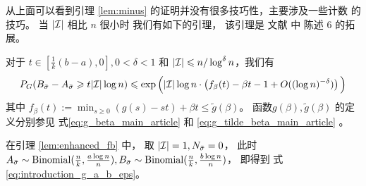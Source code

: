 从上面可以看到引理 \ref{lem:minus} 的证明并没有很多技巧性，主要涉及一些计数
的技巧。
当 $|\mathcal{I}|$ 相比  $n$ 很小时
我们有如下的引理， 该引理是 文献 中 陈述 6 的拓展。 

\begin{lemma}
  \label{lem:enhanced_fb}
	对于 $t\in [\frac{1}{k}(b-a), 0], 0<\delta <1$
	和 $ |\mathcal{I}| \leqslant n/\log^{\delta} n$，我们有
\begin{equation} \label{eq:upmpt}
	P_G(B_{\bar{\sigma}}-A_{\bar{\sigma}}\geqslant t |\mathcal{I}| \log n) 
	\leqslant  \exp\Big(|\mathcal{I}|\log n\cdot
	\left(
    f_{\beta}(t) - \beta t -1	+ O((\log n)^{-\delta}) \right)\Big)
	\end{equation}
	其中 $f_{\beta}(t) := \min_{s\geq 0} (g(s) - st) + \beta t \leq \tilde{g}(\beta) $。
  函数$g(\beta), \tilde{g}(\beta)$
  的定义分别参见
  式\eqref{eq:g_beta_main_article}
  和
  \eqref{eq:g_tilde_beta_main_article} 。
\end{lemma}

在引理 \ref{lem:enhanced_fb}  中，
取
$|\mathcal{I}|=1, N_{\bar{\sigma}}=0$，
此时$A_{\bar{\sigma}} \sim \operatorname{Binomial}(\frac{n}{k}, \frac{a \log n}{n}),
B_{\bar{\sigma}} \sim \operatorname{Binomial}(\frac{n}{k}, \frac{b \log n}{n})$，
即得到 式\eqref{eq:introduction_g_a_b_eps}。

